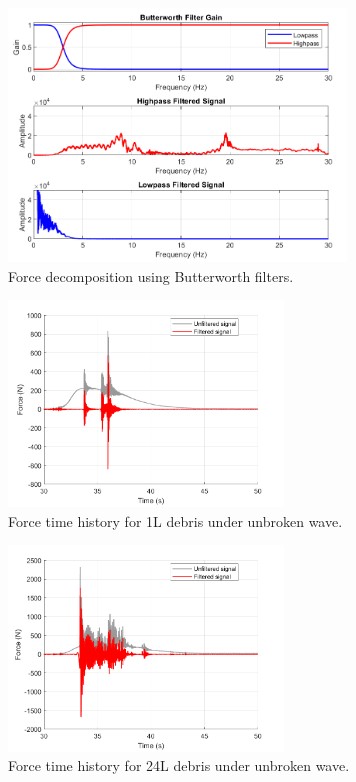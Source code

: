 \documentclass{article}
\begin{document}
\begin{figure}[htbp]
    \centering
    \includegraphics[width=0.8\textwidth]{high_low_pass.png}
    \caption{Force decomposition using Butterworth filters.}
    \label{fig:high_low_pass}
\end{figure}

\begin{figure}[h!]
    \centering
    \includegraphics[width=0.65\textwidth]{Reg_Lift_U_1_L_D__Masters_NHERIDeprisImpact2_goodtests_Reg_Lift_U_1_L_Trial04_Peak.png}
    \caption{Force time history for 1L debris under unbroken wave.}
    \label{fig:timehist_1L_peak}
\end{figure}

\begin{figure}[h!]
    \centering
    \includegraphics[width=0.65\textwidth]{Reg_Lift_U_24_L_D__Masters_NHERIDeprisImpact2_goodtests_Reg_Lift_U_24_L_Trial04_Peak.png}
    \caption{Force time history for 24L debris under unbroken wave.}
    \label{fig:timehist_24L_peak}
\end{figure}
\end{document}
